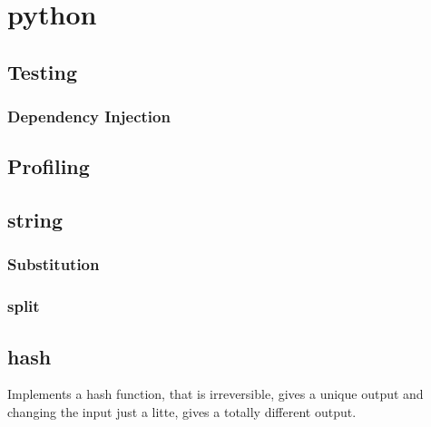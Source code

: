 \documentclass[12pt]{article}
\begin{document}
\maketitle

\section{python}

\subsection{Testing}
\scriptsize




\subsubsection{Dependency Injection}




\subsection{Profiling}


\subsection{string}

\subsubsection{Substitution}



\subsubsection{split}


	

\subsection{hash}

Implements a hash function, that is irreversible, gives a unique output and changing the input just a litte, gives a totally different output.
\end{document}
